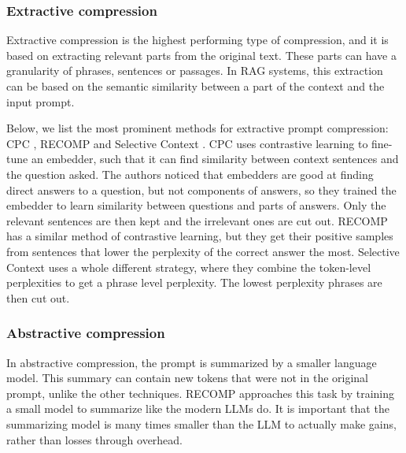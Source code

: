 \subsubsection{Extractive compression}
Extractive compression is the highest performing type of compression, and it is based on extracting relevant parts from the original text. These parts can have a granularity of phrases, sentences or passages. In RAG systems, this extraction can be based on the semantic similarity between a part of the context and the input prompt. 

Below, we list the most prominent methods for extractive prompt compression: CPC \cite{liskavets2025cpc}, RECOMP \cite{xu2023recomp} and Selective Context \cite{li2023selectivecontext}. CPC uses contrastive learning to fine-tune an embedder, such that it can find similarity between context sentences and the question asked. The authors noticed that embedders are good at finding direct answers to a question, but not components of answers, so they trained the embedder to learn similarity between questions and parts of answers. Only the relevant sentences are then kept and the irrelevant ones are cut out. RECOMP has a similar method of contrastive learning, but they get their positive samples from sentences that lower the perplexity of the correct answer the most. Selective Context uses a whole different strategy, where they combine the token-level perplexities to get a phrase level perplexity. The lowest perplexity phrases are then cut out.

\subsubsection{Abstractive compression}
In abstractive compression, the prompt is summarized by a smaller language model. This summary can contain new tokens that were not in the original prompt, unlike the other techniques. RECOMP \cite{xu2023recomp} approaches this task by training a small model to summarize like the modern LLMs do. It is important that the summarizing model is many times smaller than the LLM to actually make gains, rather than losses through overhead.

